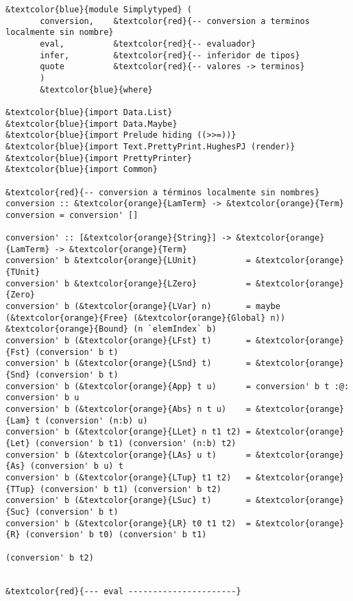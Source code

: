 \documentclass[12pt, a4paper]{article}
\begin{document}
\begin{Verbatim}[commandchars=\&\{\}]
&textcolor{blue}{module Simplytyped} (
       conversion,    &textcolor{red}{-- conversion a terminos localmente sin nombre}
       eval,          &textcolor{red}{-- evaluador}
       infer,         &textcolor{red}{-- inferidor de tipos}
       quote          &textcolor{red}{-- valores -> terminos}
       )
       &textcolor{blue}{where}

&textcolor{blue}{import Data.List}
&textcolor{blue}{import Data.Maybe}
&textcolor{blue}{import Prelude hiding ((>>=))}
&textcolor{blue}{import Text.PrettyPrint.HughesPJ (render)}
&textcolor{blue}{import PrettyPrinter}
&textcolor{blue}{import Common}

&textcolor{red}{-- conversion a términos localmente sin nombres}
conversion :: &textcolor{orange}{LamTerm} -> &textcolor{orange}{Term}
conversion = conversion' []

conversion' :: [&textcolor{orange}{String}] -> &textcolor{orange}{LamTerm} -> &textcolor{orange}{Term}
conversion' b &textcolor{orange}{LUnit}          = &textcolor{orange}{TUnit}
conversion' b &textcolor{orange}{LZero}          = &textcolor{orange}{Zero}
conversion' b (&textcolor{orange}{LVar} n)       = maybe (&textcolor{orange}{Free} (&textcolor{orange}{Global} n)) &textcolor{orange}{Bound} (n `elemIndex` b)
conversion' b (&textcolor{orange}{LFst} t)       = &textcolor{orange}{Fst} (conversion' b t)
conversion' b (&textcolor{orange}{LSnd} t)       = &textcolor{orange}{Snd} (conversion' b t)
conversion' b (&textcolor{orange}{App} t u)      = conversion' b t :@: conversion' b u
conversion' b (&textcolor{orange}{Abs} n t u)    = &textcolor{orange}{Lam} t (conversion' (n:b) u)
conversion' b (&textcolor{orange}{LLet} n t1 t2) = &textcolor{orange}{Let} (conversion' b t1) (conversion' (n:b) t2)
conversion' b (&textcolor{orange}{LAs} u t)      = &textcolor{orange}{As} (conversion' b u) t
conversion' b (&textcolor{orange}{LTup} t1 t2)   = &textcolor{orange}{TTup} (conversion' b t1) (conversion' b t2)
conversion' b (&textcolor{orange}{LSuc} t)       = &textcolor{orange}{Suc} (conversion' b t)
conversion' b (&textcolor{orange}{LR} t0 t1 t2)  = &textcolor{orange}{R} (conversion' b t0) (conversion' b t1)
                                                               (conversion' b t2)

 
&textcolor{red}{--- eval ----------------------}


\end{Verbatim}
\end{document}
